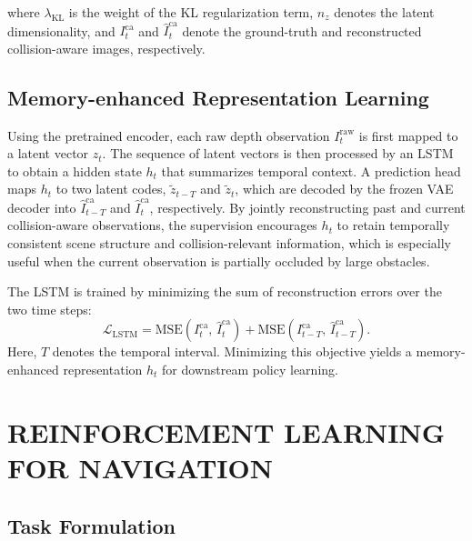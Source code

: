 \documentclass[letterpaper, 10 pt, conference]{ieeeconf}  %
\begin{document}
where $\lambda_{\mathrm{KL}}$ is the weight of the KL regularization term, $n_z$ denotes the latent dimensionality, 
and $I_t^{\mathrm{ca}}$ and $\hat{I}_t^{\mathrm{ca}}$ denote the ground-truth and reconstructed collision-aware images, respectively.


\subsection{Memory-enhanced Representation Learning}
Using the pretrained encoder, each raw depth observation $I_t^{\mathrm{raw}}$ is first mapped to a latent vector $z_t$. 
The sequence of latent vectors is then processed by an LSTM to obtain a hidden state $h_t$ that summarizes temporal context. 
A prediction head maps $h_t$ to two latent codes, $\tilde z_{t-T}$ and $\tilde z_t$, which are decoded by the frozen VAE decoder into $\hat{I}_{t-T}^{\mathrm{ca}}$ and $\hat{I}_{t}^{\mathrm{ca}}$, respectively. 
By jointly reconstructing past and current collision-aware observations, the supervision encourages $h_t$ to retain temporally consistent scene structure and collision-relevant information, 
which is especially useful when the current observation is partially occluded by large obstacles.

The LSTM is trained by minimizing the sum of reconstruction errors over the two time steps:
\begin{equation}
\mathcal{L}_{\mathrm{LSTM}}=
\mathrm{MSE}\!\left(I_{t}^{\mathrm{ca}},\,\hat{I}_{t}^{\mathrm{ca}}\right)
+
\mathrm{MSE}\!\left(I_{t-T}^{\mathrm{ca}},\,\hat{I}_{t-T}^{\mathrm{ca}}\right).
\end{equation}
Here, $T$ denotes the temporal interval. Minimizing this objective yields a memory-enhanced representation $h_t$ for downstream policy learning.

\section{REINFORCEMENT LEARNING FOR NAVIGATION}
\subsection{Task Formulation}
\end{document}
